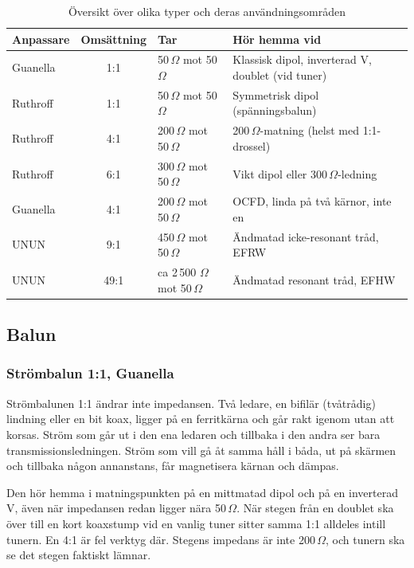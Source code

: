\begin{table}[H]
\centering
\small
\begin{tabular}{lcll}
  \textbf{Anpassare} & \textbf{Omsättning} & \textbf{Tar} & \textbf{Hör hemma vid} \\ \hline
        Guanella & 1:1  & 50\,$\Omega$ mot 50\,$\Omega$       & Klassisk dipol, inverterad V, doublet (vid tuner) \\
	Ruthroff & 1:1  & 50\,$\Omega$ mot 50\,$\Omega$       & Symmetrisk dipol (spänningsbalun)                 \\
	Ruthroff & 4:1  & 200\,$\Omega$ mot 50\,$\Omega$      & 200\,$\Omega$-matning (helst med 1:1-drossel)     \\
	Ruthroff & 6:1  & 300\,$\Omega$ mot 50\,$\Omega$      & Vikt dipol eller 300\,$\Omega$-ledning            \\
	Guanella & 4:1  & 200\,$\Omega$ mot 50\,$\Omega$      & OCFD, linda på två kärnor, inte en                \\
	UNUN     & 9:1  & 450\,$\Omega$ mot 50\,$\Omega$      & Ändmatad icke-resonant tråd, EFRW                 \\
	UNUN     & 49:1 & ca 2\,500 $\Omega$ mot 50\,$\Omega$ & Ändmatad resonant tråd, EFHW                      \\
\end{tabular}
\caption{Översikt över olika typer och deras användningsområden}
\label{tab:balunval}
\end{table}

\subsection{Balun}
\label{sec:balun}

\subsubsection{Strömbalun 1:1, Guanella}
\label{sec:guanella-11}

Strömbalunen 1:1 ändrar inte impedansen. Två ledare, en bifilär
(tvåtrådig) lindning eller en bit koax, ligger på en ferritkärna och
går rakt igenom utan att korsas. Ström som går ut i den ena ledaren
och tillbaka i den andra ser bara transmissionsledningen. Ström som
vill gå åt samma håll i båda, ut på skärmen och tillbaka någon
annanstans, får magnetisera kärnan och dämpas.

Den hör hemma i matningspunkten på en mittmatad dipol och på en
inverterad V, även när impedansen redan ligger nära 50\,$\Omega$. När
stegen från en doublet ska över till en kort koaxstump vid en vanlig
tuner sitter samma 1:1 alldeles intill tunern. En 4:1 är fel verktyg
där. Stegens impedans är inte 200\,$\Omega$, och tunern ska se det
stegen faktiskt lämnar.

